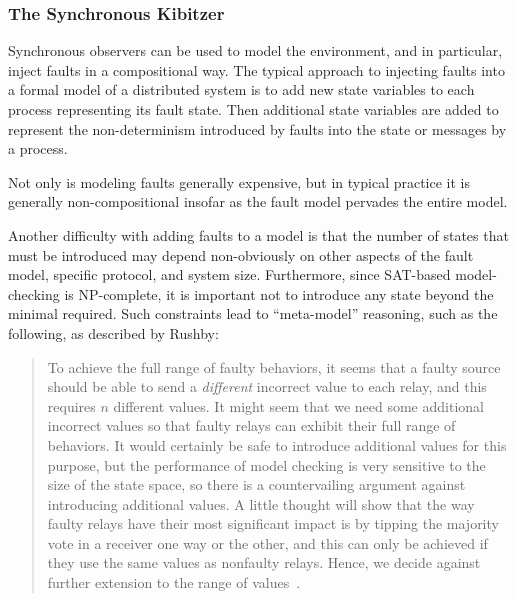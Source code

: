 \documentclass{llncs/llncs}
\newcommand{\lee}[1]{ } %
\newcommand{\lee}[1]{ {\color{blue}$<$lee: #1$>$} } %
\begin{document}
\subsubsection{The Synchronous Kibitzer}\label{sec:kibitzer}
Synchronous observers can be used to model the environment, and in particular, inject faults in a compositional way. The typical approach to injecting faults into a formal model of a distributed system is to add new state variables to each process representing its fault state. Then additional state variables are added to represent the non-determinism introduced by faults into the state or messages by a process.

\lee{cite abstractions paper and point out that we can model faults on transmission rather than node}



Not only is modeling faults generally expensive, but in typical practice it is generally non-compositional insofar as the fault model pervades the entire model.

Another difficulty with adding faults to a model is that the number of states that must be introduced may depend non-obviously on other aspects of the fault model, specific protocol, and system size. Furthermore, since SAT-based model-checking is NP-complete, it is important not to introduce any state beyond the minimal required. Such constraints lead to ``meta-model'' reasoning, such as the following, as described by Rushby:

\begin{quote}
To achieve the full range of faulty behaviors, it seems that a faulty source should be able to send a \emph{different} incorrect value to each relay, and this requires $n$ different values. It might seem that we need some additional incorrect values so that faulty relays can exhibit their full range of behaviors. It would certainly be safe to introduce additional values for this purpose, but the performance of model checking is very sensitive to the size of the state space, so there is a countervailing argument against introducing additional values. A little thought will show that the way faulty relays have their most significant impact is by tipping the majority vote in a receiver one way or the other, and this can only be achieved if they use the same values as nonfaulty relays. Hence, we decide against further extension to the range of values~\cite{Rushby:OM1}.
\end{quote}
\end{document}
